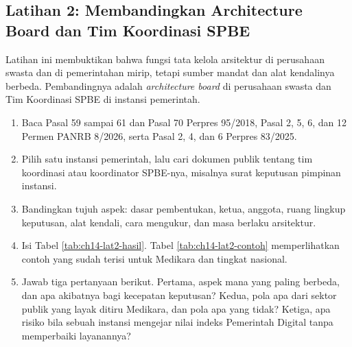 \subsection*{Latihan 2: Membandingkan Architecture Board dan Tim Koordinasi SPBE}

Latihan ini membuktikan bahwa fungsi tata kelola arsitektur di perusahaan
swasta dan di pemerintahan mirip, tetapi sumber mandat dan alat kendalinya
berbeda. Pembandingnya adalah \textit{architecture board} di perusahaan
swasta dan Tim Koordinasi SPBE di instansi pemerintah.

\begin{enumerate}
  \item Baca Pasal 59 sampai 61 dan Pasal 70 Perpres 95/2018, Pasal 2, 5, 6,
        dan 12 Permen PANRB 8/2026, serta Pasal 2, 4, dan 6 Perpres
        83/2025.
  \item Pilih satu instansi pemerintah, lalu cari dokumen publik tentang tim
        koordinasi atau koordinator SPBE-nya, misalnya surat keputusan
        pimpinan instansi.
  \item Bandingkan tujuh aspek: dasar pembentukan, ketua, anggota, ruang
        lingkup keputusan, alat kendali, cara mengukur, dan masa berlaku
        arsitektur.
  \item Isi Tabel \ref{tab:ch14-lat2-hasil}. Tabel \ref{tab:ch14-lat2-contoh}
        memperlihatkan contoh yang sudah terisi untuk Medikara dan tingkat
        nasional.
  \item Jawab tiga pertanyaan berikut. Pertama, aspek mana yang paling
        berbeda, dan apa akibatnya bagi kecepatan keputusan? Kedua, pola
        apa dari sektor publik yang layak ditiru Medikara, dan pola apa yang
        tidak? Ketiga, apa risiko bila sebuah instansi mengejar nilai indeks
        Pemerintah Digital tanpa memperbaiki layanannya?
\end{enumerate}


